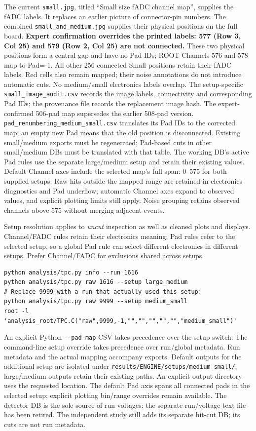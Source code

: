\documentclass[11pt,a4paper]{article}
\begin{document}
The current \texttt{small.jpg}, titled ``Small size fADC channel map'', supplies
the fADC labels. It replaces an earlier picture of connector-pin numbers.
The combined \texttt{small\_and\_medium.jpg} supplies their physical positions
on the full board. \textbf{Expert confirmation overrides the printed labels:
577 (Row 3, Col 25) and 579 (Row 2, Col 25) are not connected.} These two physical
positions form a central gap and have no Pad IDs; ROOT Channels 576 and 578 map
to Pad=-1. All other 256 connected Small positions retain their fADC labels.
Red cells also remain mapped; their noise annotations do not introduce automatic cuts.
No medium/small electronics labels overlap. The setup-specific
\texttt{small\_image\_audit.csv} records the image labels, connectivity and
corresponding Pad IDs; the provenance file records the replacement image hash.
The expert-confirmed 506-pad map supersedes the earlier 508-pad version.
\texttt{pad\_renumbering\_medium\_small.csv} translates its Pad IDs to the
corrected map; an empty new Pad means that the old position is disconnected.
Existing small/medium exports must be regenerated;
Pad-based cuts in other small/medium DBs must be translated with that table.
The working DB's active Pad rules use the separate large/medium setup and retain
their existing values. Default Channel axes include the selected map's full span:
0--575 for both supplied setups. Raw hits outside the mapped range are retained
in electronics diagnostics and Pad underflow; automatic Channel axes expand to
observed values, and explicit plotting limits still apply. Noise grouping retains
observed channels above 575 without merging adjacent events.

Setup resolution applies to \emph{uncut} inspection as well as cleaned plots
and displays. Channel/FADC rules retain their electronics meaning; Pad rules
refer to the selected setup, so a global Pad rule can select different electronics
in different setups. Prefer Channel/FADC for exclusions shared across setups.
\begin{lstlisting}
python analysis/tpc.py info --run 1616
python analysis/tpc.py raw 1616 --setup large_medium
# Replace 9999 with a run that actually used this setup:
python analysis/tpc.py raw 9999 --setup medium_small
root -l 'analysis_root/TPC.C("raw",9999,-1,"","","","","","medium_small")'
\end{lstlisting}
An explicit Python \texttt{-{}-pad-map} CSV takes precedence over the setup switch.
The command-line setup override takes precedence over run/global metadata.
Run metadata and the actual mapping accompany exports. Default outputs for the
additional setup are isolated under \texttt{results/ENGINE/setups/medium\_small/};
large/medium outputs retain their existing paths. An explicit output directory
uses the requested location. The default Pad axis spans all connected pads in
the selected setup; explicit plotting bin/range overrides remain available.
The detector DB is the sole source of run voltages: the separate run/voltage text
file has been retired. The independent study still adds its separate hit-cut DB;
its cuts are not run metadata.
\end{document}
